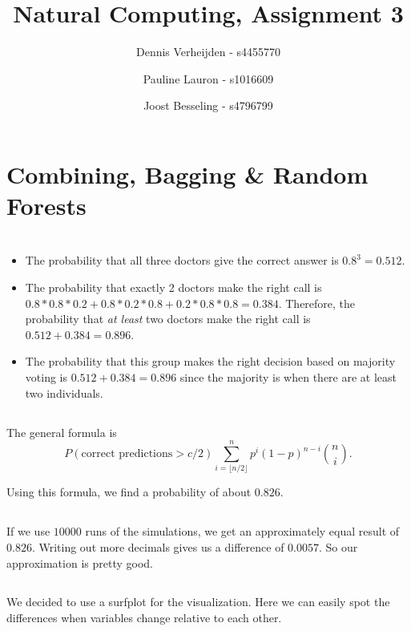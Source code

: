 \documentclass[11pt]{article}
\title{Natural Computing, Assignment 3}
\author{Dennis Verheijden - s4455770 \and Pauline Lauron - s1016609 \and Joost Besseling - s4796799}
\newcommand{\floor}[1]{\lfloor #1 \rfloor}
\begin{document}
\maketitle

\section*{Combining, Bagging \& Random Forests}
\section{}
\subsection{}
\begin{itemize}
	\item 
	The probability that all three doctors give the correct answer is $ 0.8^3 = 0.512$. 
	\item 
	The probability that exactly 2 doctors make the right call is $0.8*0.8*0.2 + 0.8*0.2*0.8 + 0.2*0.8*0.8 = 0.384$. Therefore, the probability that \emph{at least} two doctors make the right call is $0.512 + 0.384 = 0.896$.
	\item  The probability that this group makes the right decision based on majority voting is $0.512 + 0.384 = 0.896$ since the majority is when there are at least two individuals. 
\end{itemize}


\subsection{}
The general formula is 
\[
	P(\text{correct predictions} > c/2) \sum_{i = \floor{n/2}}^{n} p^{i}  (1-p)^{n-i}  \binom{n}{i}.
\]

Using this formula, we find a probability of about $0.826$.

\subsection{}
If we use $10000$ runs of the simulations, we get an approximately equal result of $0.826$. Writing out more decimals gives us a difference of $0.0057$. So our approximation is pretty good.

\subsection{}
We decided to use a surfplot for the visualization. Here we can easily spot the differences when variables change relative to each other.
\end{document}
